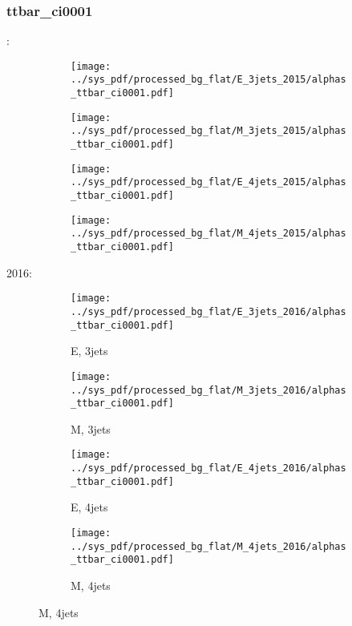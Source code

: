 \documentclass{beamer}
\begin{document}
\begin{frame}
\frametitle{ttbar_ci0001}
\fontsize{5}{1}:
\begin{figure}
\centering
\begin{subfigure}[b]{0.24\textwidth}
\texttt{[image: ../sys\_pdf/processed\_bg\_flat/E\_3jets\_2015/alphas\_ttbar\_ci0001.pdf]}
\end{subfigure}
\begin{subfigure}[b]{0.24\textwidth}
\texttt{[image: ../sys\_pdf/processed\_bg\_flat/M\_3jets\_2015/alphas\_ttbar\_ci0001.pdf]}
\end{subfigure}
\begin{subfigure}[b]{0.24\textwidth}
\texttt{[image: ../sys\_pdf/processed\_bg\_flat/E\_4jets\_2015/alphas\_ttbar\_ci0001.pdf]}
\end{subfigure}
\begin{subfigure}[b]{0.24\textwidth}
\texttt{[image: ../sys\_pdf/processed\_bg\_flat/M\_4jets\_2015/alphas\_ttbar\_ci0001.pdf]}
\end{subfigure}
\end{figure}
2016:
\begin{figure}
\centering
\begin{subfigure}[b]{0.24\textwidth}
\texttt{[image: ../sys\_pdf/processed\_bg\_flat/E\_3jets\_2016/alphas\_ttbar\_ci0001.pdf]}
\captionsetup{font=tiny}
\caption{E, 3jets}
\end{subfigure}
\begin{subfigure}[b]{0.24\textwidth}
\texttt{[image: ../sys\_pdf/processed\_bg\_flat/M\_3jets\_2016/alphas\_ttbar\_ci0001.pdf]}
\captionsetup{font=tiny}
\caption{M, 3jets}
\end{subfigure}
\begin{subfigure}[b]{0.24\textwidth}
\texttt{[image: ../sys\_pdf/processed\_bg\_flat/E\_4jets\_2016/alphas\_ttbar\_ci0001.pdf]}
\captionsetup{font=tiny}
\caption{E, 4jets}
\end{subfigure}
\begin{subfigure}[b]{0.24\textwidth}
\texttt{[image: ../sys\_pdf/processed\_bg\_flat/M\_4jets\_2016/alphas\_ttbar\_ci0001.pdf]}
\captionsetup{font=tiny}
\caption{M, 4jets}
\end{subfigure}
\end{figure}
\end{frame}
\end{document}
